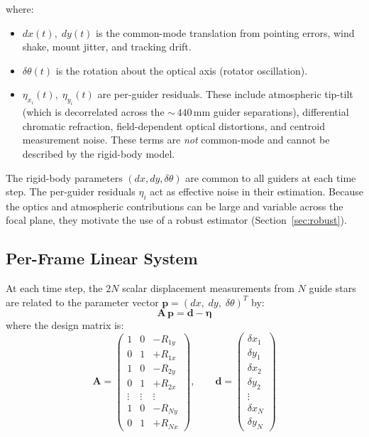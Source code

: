 \documentclass[SE,lsstdraft,authoryear,toc]{lsstdoc}
\begin{document}
\noindent
where:
\begin{itemize}
\item $dx(t),\; dy(t)$ is the common-mode translation from pointing
  errors, wind shake, mount jitter, and tracking drift.

\item $\delta\theta(t)$ is the rotation about the optical axis (rotator
  oscillation).

\item $\eta_{x_i}(t),\; \eta_{y_i}(t)$ are per-guider residuals.
  These include atmospheric tip-tilt (which is decorrelated across the
  ${\sim}\,440$\,mm guider separations), differential chromatic
  refraction, field-dependent optical distortions, and centroid
  measurement noise.  These terms are \emph{not} common-mode and
  cannot be described by the rigid-body model.
\end{itemize}

The rigid-body parameters $(dx, dy, \delta\theta)$ are common to all
guiders at each time step.  The per-guider residuals $\eta_i$ act as
effective noise in their estimation.  Because the optics and
atmospheric contributions can be large and variable across the focal
plane, they motivate the use of a robust estimator
(Section~\ref{sec:robust}).

\subsection{Per-Frame Linear System}
\label{sec:perframe}

At each time step, the $2N$ scalar displacement measurements from $N$
guide stars are related to the parameter vector
$\mathbf{p} = (dx,\; dy,\; \delta\theta)^T$ by:
\begin{equation}
\mathbf{A}\,\mathbf{p} = \mathbf{d} - \symbf{\eta}
\end{equation}
where the design matrix is:
\begin{equation}
\mathbf{A} =
\begin{pmatrix}
1 & 0 & -R_{1y} \\
0 & 1 & +R_{1x} \\
1 & 0 & -R_{2y} \\
0 & 1 & +R_{2x} \\
\vdots & \vdots & \vdots \\
1 & 0 & -R_{Ny} \\
0 & 1 & +R_{Nx}
\end{pmatrix},
\qquad
\mathbf{d} =
\begin{pmatrix}
\delta x_1 \\ \delta y_1 \\
\delta x_2 \\ \delta y_2 \\
\vdots \\
\delta x_N \\ \delta y_N
\end{pmatrix}
\label{eq:designmatrix_fp}
\end{equation}
\end{document}

